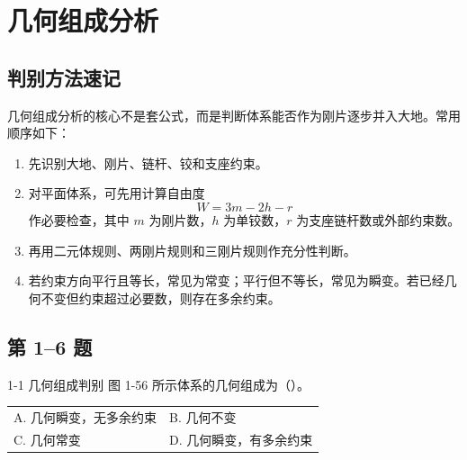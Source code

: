 ﻿\chapter{几何组成分析}

\section{判别方法速记}

\begin{notecard}
几何组成分析的核心不是套公式，而是判断体系能否作为刚片逐步并入大地。常用顺序如下：
\begin{enumerate}
  \item 先识别大地、刚片、链杆、铰和支座约束。
  \item 对平面体系，可先用计算自由度
  \[
    W=3m-2h-r
  \]
  作必要检查，其中 \(m\) 为刚片数，\(h\) 为单铰数，\(r\) 为支座链杆数或外部约束数。
  \item 再用二元体规则、两刚片规则和三刚片规则作充分性判断。
  \item 若约束方向平行且等长，常见为常变；平行但不等长，常见为瞬变。若已经几何不变但约束超过必要数，则存在多余约束。
\end{enumerate}
\end{notecard}

\section{第 1--6 题}

\begin{problemcard}{1-1 几何组成判别 }
图 1-56 所示体系的几何组成为（\quad）。

\begin{tabularx}{\textwidth}{@{}XX@{}}
A. 几何瞬变，无多余约束 & B. 几何不变 \\
C. 几何常变 & D. 几何瞬变，有多余约束
\end{tabularx}

\begin{figure}[H]
\centering
{}
\end{figure}
\end{problemcard}

